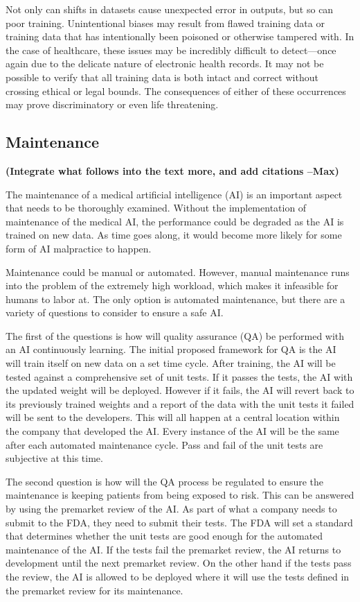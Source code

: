 \documentclass[]{article}
\begin{document}
		Not only can shifts in datasets cause unexpected error in outputs, but so can poor training. Unintentional biases may result from flawed training data\cite{7912315} or training data that has intentionally been poisoned or otherwise tampered with\cite{6868201}. In the case of healthcare, these issues may be incredibly difficult to detect---once again due to the delicate nature of electronic health records. It may not be possible to verify that all training data is both intact and correct without crossing ethical or legal bounds. The consequences of either of these occurrences may prove discriminatory or even life threatening.

		\subsection{Maintenance}
			\textbf{(Integrate what follows into the text more, and add citations --Max)}

			The maintenance of a medical artificial intelligence (AI) is an important aspect that needs to be thoroughly examined. Without the implementation of maintenance of the medical AI, the performance could be degraded as the AI is trained on new data. As time goes along, it would become more likely for some form of AI malpractice to happen.
		
			Maintenance could be manual or automated. However, manual maintenance runs into the problem of the extremely high workload, which makes it infeasible for humans to labor at. The only option is automated maintenance, but there are a variety of questions to consider to ensure a safe AI.
		
			The first of the questions is how will quality assurance (QA) be performed with an AI continuously learning. The initial proposed framework for QA is the AI will train itself on new data on a set time cycle. After training, the AI will be tested against a comprehensive set of unit tests. If it passes the tests, the AI with the updated weight will be deployed. However if it fails, the AI will revert back to its previously trained weights and a report of the data with the unit tests it failed will be sent to the developers. This will all happen at a central location within the company that developed the AI. Every instance of the AI will be the same after each automated maintenance cycle. Pass and fail of the unit tests are subjective at this time.

			The second question is how will the QA process be regulated to ensure the maintenance is keeping patients from being exposed to risk. This can be answered by using the premarket review of the AI. As part of what a company needs to submit to the FDA, they need to submit their tests. The FDA will set a standard that determines whether the unit tests are good enough for the automated maintenance of the AI. If the tests fail the premarket review, the AI returns to development until the next premarket review. On the other hand if the tests pass the review, the AI is allowed to be deployed where it will use the tests defined in the premarket review for its maintenance.
\end{document}
